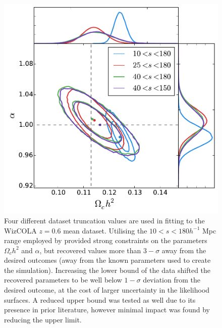 \documentclass[iop,twocolappendix]{emulateapj}
\begin{document}
\begin{figure}[t]
	\begin{center}
		\includegraphics[width=\columnwidth]{images/CdatasetTrunc.pdf}
	\end{center}
	\caption{Four different dataset truncation values are used in fitting to the WizCOLA $z=0.6$ mean dataset. Utilising the $10<s<180 h^{-1}$ Mpc range employed by \citet{BlakeDavis2011} provided strong constraints on the parameters $\Omega_c h^2$ and $\alpha$, but recovered values more than $3-\sigma$ away from the desired outcomes (away from the known parameters used to create the simulation). Increasing the lower bound of the data shifted the recovered parameters to be well below $1-\sigma$ deviation from the desired outcome, at the cost of larger uncertainty in the likelihood surfaces. A reduced upper bound was tested as well due to its presence in prior literature, however minimal impact was found by reducing the upper limit.}
	\label{fig:CdatasetTrunc}
\end{figure}
\end{document}
